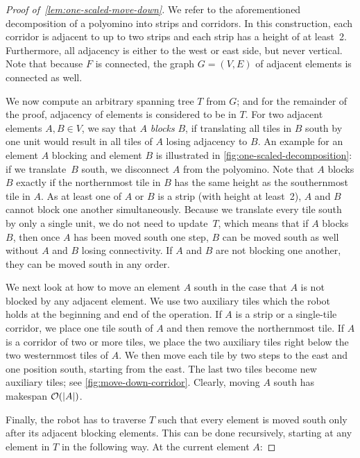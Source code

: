 \begin{proof}[Proof of~\cref{lem:one-scaled-move-down}]
	We refer to the aforementioned decomposition of a polyomino into strips and corridors.
	In this construction, each corridor is adjacent to up to two strips and each strip has a height of at least~2.
	Furthermore, all adjacency is either to the west or east side, but never vertical.
	Note that because $F$ is connected, the graph $G = (V, E)$ of adjacent elements is connected as well.

	We now compute an arbitrary spanning tree $T$ from $G$; and for the remainder of the proof, adjacency of elements is considered to be in $T$.
	For two adjacent elements $A, B \in V$, we say that $A$ \emph{blocks} $B$, if translating all tiles in $B$ south by one unit would result in all tiles of $A$ losing adjacency to $B$.
	An example for an element $A$ blocking and element $B$ is illustrated in \cref{fig:one-scaled-decomposition}: if we translate~$B$ south, we disconnect $A$ from the polyomino.
	Note that $A$ blocks $B$ exactly if the northernmost tile in $B$ has the same height as the southernmost tile in $A$.
	As at least one of $A$ or $B$ is a strip (with height at least~2), $A$ and $B$ cannot block one another simultaneously.
	Because we translate every tile south by only a single unit, we do not need to update~$T$,
	which means that if $A$ blocks $B$, then once $A$ has been moved south one step, $B$ can be moved south as well without $A$ and $B$ losing connectivity.
	If $A$ and $B$ are not blocking one another, they can be moved south in any order.
	
	We next look at how to move an element $A$ south in the case that $A$ is not blocked by any adjacent element.
	We use two auxiliary tiles which the robot holds at the beginning and end of the operation.
	If $A$ is a strip or a single-tile corridor, we place one tile south of $A$ and then remove the northernmost tile.
	If $A$ is a corridor of two or more tiles, we place the two auxiliary tiles right below the two westernmost tiles of $A$.
	We then move each tile by two steps to the east and one position south, starting from the east.
	The last two tiles become new auxiliary tiles; see \cref{fig:move-down-corridor}.
	Clearly, moving $A$ south has makespan $\mathcal{O}(|A|)$.
		
	Finally, the robot has to traverse $T$ such that every element is moved south only after its adjacent blocking elements.
	This can be done recursively, starting at any element in $T$ in the following way.
	At the current element $A$:
	

\end{proof}
